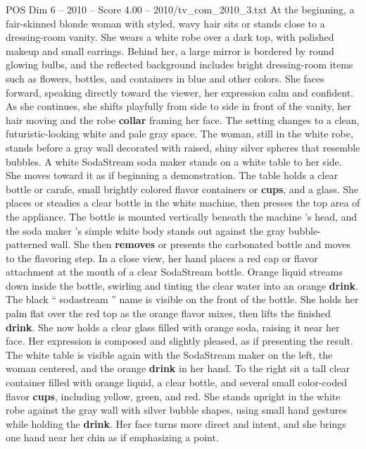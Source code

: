 \begin{textsample}{POS Dim 6 – 2010 – Score 4.00 – 2010/tv\_com\_2010\_3.txt}  \label{ex:f6_pos_090}
At the beginning, a fair-skinned blonde woman with styled, wavy hair sits or stands close to a dressing-room vanity.
She wears a white robe over a dark top, with polished makeup and small earrings.
Behind her, a large mirror is bordered by round glowing bulbs, and the reflected background includes bright dressing-room items such as flowers, bottles, and containers in blue and other colors.
She faces forward, speaking directly toward the viewer, her expression calm and confident.
As she continues, she shifts playfully from side to side in front of the vanity, her hair moving and the robe \textbf{collar} framing her face.
The setting changes to a clean, futuristic-looking white and pale gray space.
The woman, still in the white robe, stands before a gray wall decorated with raised, shiny silver spheres that resemble bubbles.
A white SodaStream soda maker stands on a white table to her side.
She moves toward it as if beginning a demonstration.
The table holds a clear bottle or carafe, small brightly colored flavor containers or \textbf{cups}, and a glass.
She places or steadies a clear bottle in the white machine, then presses the top area of the appliance.
The bottle is mounted vertically beneath the machine ’s head, and the soda maker ’s simple white body stands out against the gray bubble-patterned wall.
She then \textbf{removes} or presents the carbonated bottle and moves to the flavoring step.
In a close view, her hand places a red cap or flavor attachment at the mouth of a clear SodaStream bottle.
Orange liquid streams down inside the bottle, swirling and tinting the clear water into an orange \textbf{drink}.
The black “ sodastream ” name is visible on the front of the bottle.
She holds her palm flat over the red top as the orange flavor mixes, then lifts the finished \textbf{drink}.
She now holds a clear glass filled with orange soda, raising it near her face.
Her expression is composed and slightly pleased, as if presenting the result.
The white table is visible again with the SodaStream maker on the left, the woman centered, and the orange \textbf{drink} in her hand.
To the right sit a tall clear container filled with orange liquid, a clear bottle, and several small color-coded flavor \textbf{cups}, including yellow, green, and red.
She stands upright in the white robe against the gray wall with silver bubble shapes, using small hand gestures while holding the \textbf{drink}.
Her face turns more direct and intent, and she brings one hand near her chin as if emphasizing a point.

\end{textsample}
